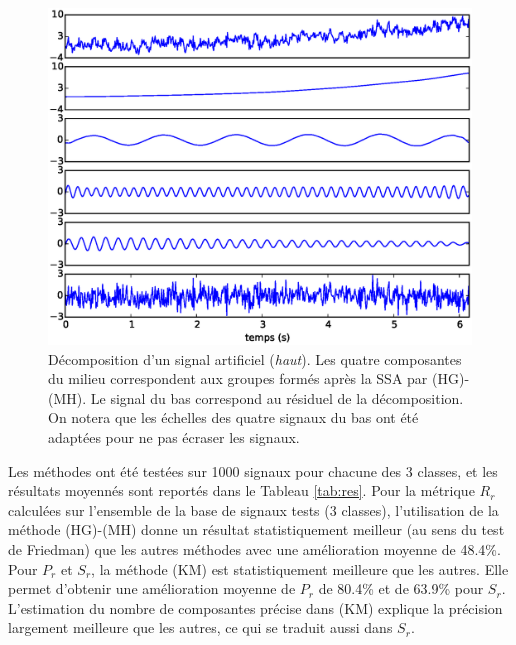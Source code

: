 \documentclass{gretsi}
\begin{document}
    \begin{figure}[tp]
        \centering
        \includegraphics[width=.5\textwidth]{img/artsig3.eps}
        \caption{Décomposition d'un signal artificiel (\emph{haut}). Les quatre composantes du milieu correspondent aux groupes formés après la SSA par (HG)-(MH). Le signal du bas correspond au résiduel de la décomposition. On notera que les échelles des quatre signaux du bas ont été adaptées pour ne pas écraser les signaux.} %
        \label{fig:dec}
    \end{figure}

Les méthodes ont été testées sur 1000 signaux pour chacune des 3 classes, et les résultats moyennés sont reportés dans le Tableau \ref{tab:res}.
Pour la métrique $R_r$ calculées sur l'ensemble de la base de signaux tests (3 classes), l'utilisation de la méthode (HG)-(MH) donne un résultat statistiquement meilleur (au sens du test de Friedman) que les autres méthodes avec une amélioration moyenne de 48.4\%.
Pour $P_r$ et $S_r$, la méthode (KM) est statistiquement meilleure que les autres.
Elle permet d'obtenir une amélioration moyenne de $P_r$ de 80.4\% et de 63.9\% pour $S_r$.
L'estimation du nombre de composantes précise dans (KM) explique la précision largement meilleure que les autres, ce qui se traduit aussi dans $S_r$.

\end{document}
